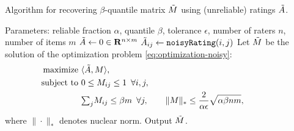 

\begin{algorithm}[b!]
\caption{Algorithm for recovering $\beta$-quantile matrix $\tilde{M}$ using
(unreliable) ratings $\tilde{A}$.}
\label{alg:recover-M}
\begin{algorithmic}[1]
\State Parameters: reliable fraction $\alpha$, quantile $\beta$, tolerance $\epsilon$, number of raters $n$, number of items $m$
\State $\tilde{A} \gets 0 \in \mathbf{R}^{n \times m}$
 
 
\EndIf
{} 
\State $\tilde{A}_{ij} \gets \texttt{noisyRating}(i,j)$
\EndIf
\EndFor
\State
\State Let $\tilde{M}$ be the solution of the optimization problem \eqref{eq:optimization-noisy}:
  \begin{align}
  \label{eq:optimization-noisy}
  \text{maximize } &\langle \tilde{A}, M \rangle, \\
  \notag \text{ subject to } &0 \leq M_{ij} \leq 1 \,\,\, \forall i,j, \\
  \notag                     &{\textstyle \sum_{j}} M_{ij} \leq \beta m \,\,\, \forall j, \quad\quad
                      \|M\|_* \leq \frac{2}{\alpha\epsilon}\sqrt{\alpha\beta nm}, \phantom{xxxxxxx}
  \end{align}
  where $\|\cdot\|_*$ denotes nuclear norm.
\State Output $\tilde{M}$.
\end{algorithmic}
\end{algorithm}
